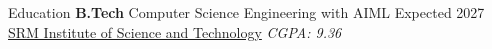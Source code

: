 \documentclass{resume} %
\begin{document}









    
    
    



\begin{rSection}{Education}
    \textbf{B.Tech} Computer Science Engineering with AIML \hfill Expected 2027\\
\href{https://www.linkedin.com/school/s.r.m.-institute-of-science-&-technology-chennai/}{SRM Institute of Science and Technology} \hfill \textit{CGPA: 9.36}

\end{rSection}
\end{document}
